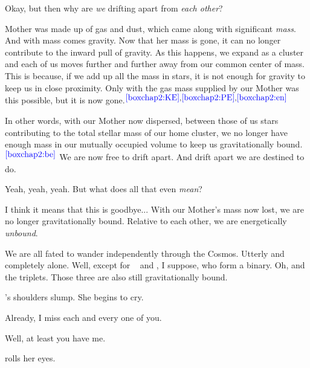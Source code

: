 \documentclass[main.tex]{subfiles}
\begin{document}
\par \Electra Okay, but then why are \textit{we} drifting apart from \textit{each other}?

\par \Maia Mother was made up of gas and dust, which came along with significant \textit{mass}.  And with mass comes gravity.  Now that her mass is gone, it can no longer contribute to the inward pull of gravity.  As this happens, we expand as a cluster and each of us moves further and further away from our common center of mass. This is because, if we add up all the mass in stars, it is not enough for gravity to keep us in close proximity.  Only with the gas mass supplied by our Mother was this possible, but it is now gone.$^{\textcolor{blue}{\ref{boxchap2:KE}},\textcolor{blue}{\ref{boxchap2:PE}},\textcolor{blue}{\ref{boxchap2:en}}}$

\par \Maia In other words, with our Mother now dispersed, between those of us stars contributing to the total stellar mass of our home cluster, we no longer have enough mass in our mutually occupied volume to keep us gravitationally bound.$^{\textcolor{blue}{\ref{boxchap2:be}}}$  We are now free to drift apart.  And drift apart we are destined to do. 


\par \Taygete Yeah, yeah, yeah.  But what does all that even \textit{mean}?

\par \Sterope I think it means that this is goodbye...  With our Mother's mass now lost, we are no longer gravitationally bound.  Relative to each other, we are energetically \textit{unbound}.%

\par \Sterope We are all fated to wander independently through the Cosmos.  Utterly and completely alone.  Well, except for \rmmaia~ and \rmmerope, I suppose, who form a binary.  Oh, and the triplets.  Those three are also still gravitationally bound.

\par \nar \rmalcyone's shoulders slump.  She begins to cry.

\par \Alcyone Already, I miss each and every one of you.

\par \Taygete Well, at least you have me.

\par \nar \rmalcyone rolls her eyes.
\end{document}
